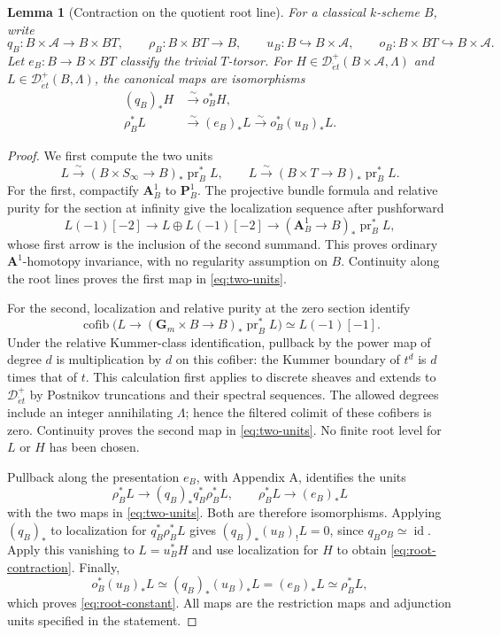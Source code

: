 \documentclass[11pt,a4paper]{article}
\newcommand{\A}{\mathbf A}
\newcommand{\Gm}{\mathbf G_m}
\newcommand{\pr}{\operatorname{pr}}
\newcommand{\cofib}{\operatorname{cofib}}
\newcommand{\Det}{\mathcal D_{\acute et}}
\newcommand{\cA}{\mathscr A}
\theoremstyle{notes}
\newtheorem{blem}{Lemma}[section]
\begin{document}
\begin{blem}[Contraction on the quotient root line]\label{lem:root}
For a classical $k$-scheme $B$, write
\[
q_B:B\times\cA\to B\times BT,\qquad \rho_B:B\times BT\to B,
\qquad u_B:B\hookrightarrow B\times\cA,\qquad o_B:B\times BT\hookrightarrow B\times\cA.
\]
Let $e_B:B\to B\times BT$ classify the trivial $T$-torsor. For $H\in\Det^+(B\times\cA,\Lambda)$ and $L\in\Det^+(B,\Lambda)$, the canonical maps are isomorphisms
\begin{align}
(q_B)_*H&\xrightarrow{\sim}o_B^*H,\label{eq:root-contraction}\\
\rho_B^*L&\xrightarrow{\sim}(e_B)_*L\xrightarrow{\sim}o_B^*(u_B)_*L.\label{eq:root-constant}
\end{align}
\end{blem}

\begin{proof}
We first compute the two units
\begin{equation}\label{eq:two-units}
L\xrightarrow{\sim}(B\times S_\infty\to B)_*\pr_B^*L,
\qquad
L\xrightarrow{\sim}(B\times T\to B)_*\pr_B^*L.
\end{equation}
For the first, compactify $\A^1_B$ to $\mathbf P^1_B$. The projective bundle formula and relative purity for the section at infinity give the localization sequence after pushforward
\[
L(-1)[-2]\longrightarrow L\oplus L(-1)[-2]
\longrightarrow(\A^1_B\to B)_*\pr_B^*L,
\]
whose first arrow is the inclusion of the second summand. This proves ordinary $\A^1$-homotopy invariance, with no regularity assumption on $B$. Continuity along the root lines proves the first map in \eqref{eq:two-units}.

For the second, localization and relative purity at the zero section identify
\[
\cofib\bigl(L\longrightarrow(\Gm\times B\to B)_*\pr_B^*L\bigr)
\simeq L(-1)[-1].
\]
Under the relative Kummer-class identification, pullback by the power map of degree $d$ is multiplication by $d$ on this cofiber: the Kummer boundary of $t^d$ is $d$ times that of $t$. This calculation first applies to discrete sheaves and extends to $\Det^+$ by Postnikov truncations and their spectral sequences. The allowed degrees include an integer annihilating $\Lambda$; hence the filtered colimit of these cofibers is zero. Continuity proves the second map in \eqref{eq:two-units}. No finite root level for $L$ or $H$ has been chosen.

Pullback along the presentation $e_B$, with Appendix A, identifies the units
\[
\rho_B^*L\longrightarrow(q_B)_*q_B^*\rho_B^*L,
\qquad \rho_B^*L\longrightarrow(e_B)_*L
\]
with the two maps in \eqref{eq:two-units}. Both are therefore isomorphisms. Applying $(q_B)_*$ to localization for $q_B^*\rho_B^*L$ gives $(q_B)_*(u_B)_!L=0$, since $q_Bo_B\simeq\operatorname{id}$. Apply this vanishing to $L=u_B^*H$ and use localization for $H$ to obtain \eqref{eq:root-contraction}. Finally,
\[
o_B^*(u_B)_*L\simeq(q_B)_*(u_B)_*L=(e_B)_*L\simeq\rho_B^*L,
\]
which proves \eqref{eq:root-constant}. All maps are the restriction maps and adjunction units specified in the statement.
\end{proof}
\end{document}
